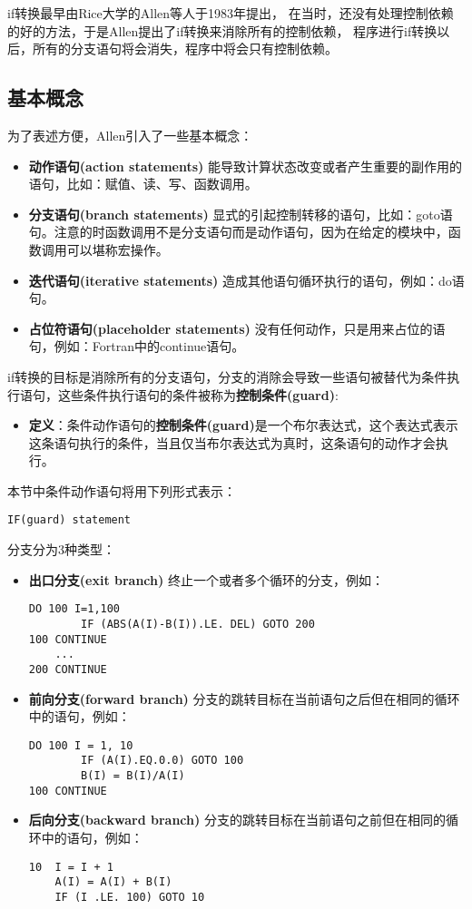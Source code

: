 \documentclass[11pt,a4paper]{article}
\begin{document}
if转换最早由Rice大学的Allen等人于1983年提出\cite{allen1983Concondeptodatdep}，
在当时，还没有处理控制依赖的好的方法，于是Allen提出了if转换来消除所有的控制依赖，
程序进行if转换以后，所有的分支语句将会消失，程序中将会只有控制依赖。

\subsection{基本概念}

为了表述方便，Allen引入了一些基本概念：
\begin{itemize}
\item \textbf{动作语句(action statements)}
能导致计算状态改变或者产生重要的副作用的语句，比如：赋值、读、写、函数调用。
\item \textbf{分支语句(branch statements)}
显式的引起控制转移的语句，比如：goto语句。注意的时函数调用不是分支语句而是动作语句，因为在给定的模块中，函数调用可以堪称宏操作。
\item \textbf{迭代语句(iterative statements)}
造成其他语句循环执行的语句，例如：do语句。
\item \textbf{占位符语句(placeholder statements)}
没有任何动作，只是用来占位的语句，例如：Fortran中的continue语句。
\end{itemize}

if转换的目标是消除所有的分支语句，分支的消除会导致一些语句被替代为条件执行语句，这些条件执行语句的条件被称为\textbf{控制条件(guard)}:

\begin{itemize}
\item \textbf{定义}：条件动作语句的\textbf{控制条件(guard)}是一个布尔表达式，这个表达式表示这条语句执行的条件，当且仅当布尔表达式为真时，这条语句的动作才会执行。
\end{itemize}

本节中条件动作语句将用下列形式表示：
\begin{lstlisting}[language=FORTRAN]
IF(guard) statement
\end{lstlisting}

分支分为3种类型：
\begin{itemize}
\item \textbf{出口分支(exit branch)}
终止一个或者多个循环的分支，例如：
\begin{lstlisting}[language=FORTRAN]
	DO 100 I=1,100
		IF (ABS(A(I)-B(I)).LE. DEL) GOTO 200
100	CONTINUE
	...
200 CONTINUE
\end{lstlisting}
\item \textbf{前向分支(forward branch)}
分支的跳转目标在当前语句之后但在相同的循环中的语句，例如：
\begin{lstlisting}[language=FORTRAN]
	DO 100 I = 1, 10
		IF (A(I).EQ.0.0) GOTO 100
		B(I) = B(I)/A(I)
100	CONTINUE
\end{lstlisting}
\item \textbf{后向分支(backward branch)}
分支的跳转目标在当前语句之前但在相同的循环中的语句，例如：
\begin{lstlisting}[language=FORTRAN]
10	I = I + 1
	A(I) = A(I) + B(I)
	IF (I .LE. 100) GOTO 10
\end{lstlisting}
\end{itemize}
\end{document}
